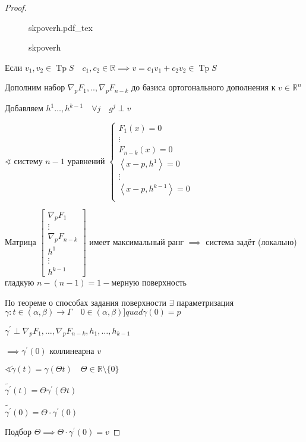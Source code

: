 \documentclass{book}
\newcommand\R{\ensuremath{\mathbb{R}}}
\newcommand{\p}[1]{#1^{\prime}}
\newcommand{\tl}[1]{\widetilde{#1}}
\theoremstyle{definition}
\newcommand{\incfig}[1]{%
    \def\svgwidth{\columnwidth}
    {#1.pdf_tex}
}
\DeclareMathOperator{\Tp}{Tp}
\begin{document}
  \begin{proof}
\begin{figure}[!ht]
    \centering
    \incfig{skpoverh}
    \caption{skpoverh}
    \label{fig:skpoverh}
\end{figure}

Если $v_1, v_2\in \Tp S\quad c_1, c_2\in \R \implies v = c_1v_1 + c_2v_2\in \Tp S$

Дополним набор $\nabla _pF_1, .., \nabla _pF_{n-k}$ до базиса ортогонального дополнения к $v\in \R^n$

Добавляем $h^1 \ldots, h^{k-1}\quad \forall j\quad g^j\perp v$

$\sphericalangle $ систему $n-1$ уравнений  $\begin{cases}
    F_1(x) = 0\\
    \vdots\\
    F_{n-k}(x) = 0\\
    \left<x-p, h^1 \right> = 0\\
    \vdots\\
    \left<x-p, h^{k-1} \right> = 0\\
\end{cases}$

Матрица $\begin{bmatrix} 
        \nabla _pF_1\\
        \vdots\\
        \nabla _p F_{n-k}\\
        h^1\\
        \vdots\\
        h^{k-1}
    \end{bmatrix} $  имеет максимальный ранг $\implies $ система задёт (локально) гладкую $n - (n-1) = 1-$мерную поверхность 

    По теореме о способах задания поверхности $\exists $ параметризация $\gamma: t\in \left( \alpha, \beta \right) \to \Gamma\quad 0\in \left( \alpha, \beta \right) ]quad \gamma(0) = p$

    $\p \gamma \perp \nabla_p F_1, \ldots, \nabla _p F_{n-k}, h_1, \ldots, h_{k-1}$

    $\implies \p \gamma(0)$ коллинеарна $v$

    $\sphericalangle \tl \gamma(t) = \gamma(\Theta t)\quad \Theta \in \R\setminus \{0\}$

    $\tl {\p \gamma}(t) = \Theta \p \gamma(\Theta t)$

    $\tl {\p \gamma}(0) = \Theta \cdot  \p \gamma(0)$

    Подбор $\Theta \implies \Theta \cdot  \p \gamma(0) = v$

  \end{proof}
\end{document}
